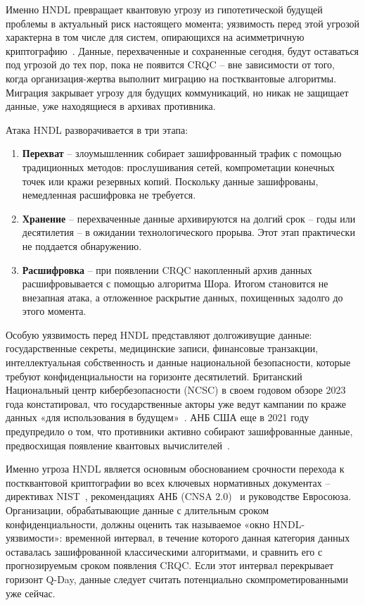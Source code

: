 \documentclass{itmo-vkr}
\begin{document}
	Именно HNDL превращает квантовую угрозу из гипотетической будущей проблемы в актуальный риск настоящего момента; уязвимость перед этой угрозой характерна в том числе для систем, опирающихся на асимметричную криптографию~\cite{petrenko2022blockchain}. Данные, перехваченные и сохраненные сегодня, будут оставаться под угрозой до тех пор, пока не появится CRQC -- вне зависимости от того, когда организация-жертва выполнит миграцию на постквантовые алгоритмы. Миграция закрывает угрозу для будущих коммуникаций, но никак не защищает данные, уже находящиеся в архивах противника.
	
	Атака HNDL разворачивается в три этапа:
	
	\begin{enumerate}
		\item \textbf{Перехват} -- злоумышленник собирает зашифрованный трафик с помощью традиционных методов: прослушивания сетей, компрометации конечных точек или кражи резервных копий. Поскольку данные зашифрованы, немедленная расшифровка не требуется.
		\item \textbf{Хранение} -- перехваченные данные архивируются на долгий срок -- годы или десятилетия -- в ожидании технологического прорыва. Этот этап практически не поддается обнаружению.
		\item \textbf{Расшифровка} -- при появлении CRQC накопленный архив данных расшифровывается с помощью алгоритма Шора. Итогом становится не внезапная атака, а отложенное раскрытие данных, похищенных задолго до этого момента.
	\end{enumerate}
	
	Особую уязвимость перед HNDL представляют долгоживущие данные: государственные секреты, медицинские записи, финансовые транзакции, интеллектуальная собственность и данные национальной безопасности, которые требуют конфиденциальности на горизонте десятилетий. Британский Национальный центр кибербезопасности (NCSC) в своем годовом обзоре 2023 года констатировал, что государственные акторы уже ведут кампании по краже данных «для использования в будущем»~\cite{ncsc2023annual}. АНБ США еще в 2021 году предупредило о том, что противники активно собирают зашифрованные данные, предвосхищая появление квантовых вычислителей~\cite{nsa-quantum-faq2021}.
	
	Именно угроза HNDL является основным обоснованием срочности перехода к постквантовой криптографии во всех ключевых нормативных документах -- директивах NIST~\cite{nist-ir8547}, рекомендациях АНБ (CNSA 2.0)~\cite{nsa-cnsa2} и руководстве Евросоюза. Организации, обрабатывающие данные с длительным сроком конфиденциальности, должны оценить так называемое «окно HNDL-уязвимости»: временной интервал, в течение которого данная категория данных оставалась зашифрованной классическими алгоритмами, и сравнить его с прогнозируемым сроком появления CRQC. Если этот интервал перекрывает горизонт Q-Day, данные следует считать потенциально скомпрометированными уже сейчас.
	
\end{document}
